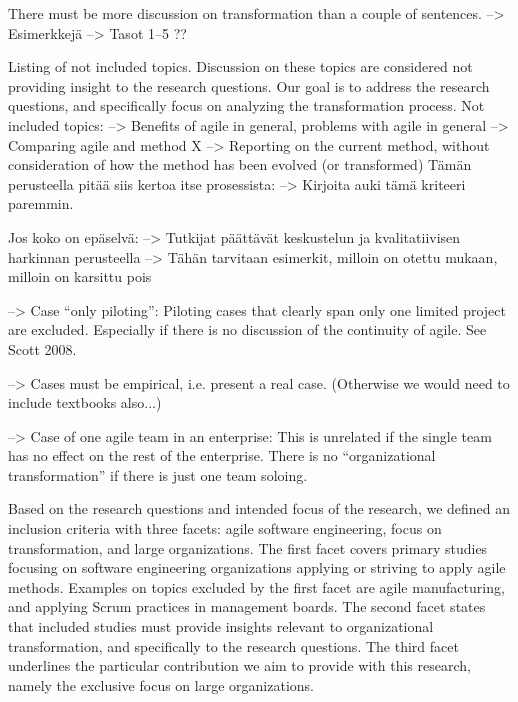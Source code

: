 \documentclass[preprint,authoryear,12pt]{elsarticle}
\begin{document}
There must be more discussion on transformation than a couple of sentences.
--> Esimerkkejä
--> Tasot 1--5 ??

Listing of not included topics. Discussion on these topics are considered not
providing insight to the research questions. Our goal is to address the research
questions, and specifically focus on analyzing the transformation process.
Not included topics:
--> Benefits of agile in general, problems with agile in general
--> Comparing agile and method X
--> Reporting on the current method, without consideration of how the method has
    been evolved (or transformed)
Tämän perusteella pitää siis kertoa itse prosessista: --> Kirjoita auki tämä
kriteeri paremmin.


Jos koko on epäselvä:
--> Tutkijat päättävät keskustelun ja kvalitatiivisen harkinnan perusteella
--> Tähän tarvitaan esimerkit, milloin on otettu mukaan, milloin on karsittu
    pois


--> Case ``only piloting'': Piloting cases that clearly span only one limited
    project are excluded. Especially if there is no discussion of the continuity
    of agile. See Scott 2008.


--> Cases must be empirical, i.e. present a real case. (Otherwise we would need
    to include textbooks also...)


--> Case of one agile team in an enterprise: This is unrelated if the single
    team has no effect on the rest of the enterprise. There is no
    ``organizational transformation'' if there is just one team soloing.  



Based on the research questions and intended focus of the research, we defined
an inclusion criteria with three facets: agile software engineering, focus on
transformation, and large organizations. The first facet covers primary studies
focusing on software engineering organizations applying or striving to apply
agile methods. Examples on topics excluded by the first facet are agile
manufacturing, and applying Scrum practices in management boards. The second
facet states that included studies must provide insights relevant to
organizational transformation, and specifically to the research questions.
The third facet underlines the particular contribution we aim to provide with
this research, namely the exclusive focus on large organizations.
\end{document}
